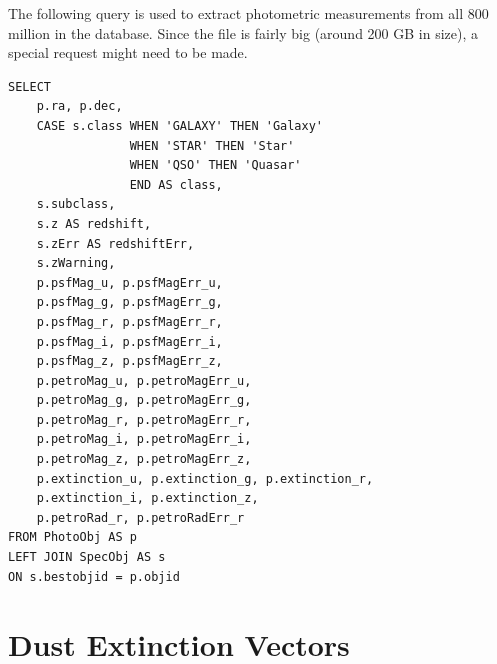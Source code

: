The following query is used to extract photometric measurements from all 800 million
in the database. Since the file is fairly big (around 200 GB in size),
a special request might need to be made.

\begin{verbatim}
SELECT
	p.ra, p.dec,
	CASE s.class WHEN 'GALAXY' THEN 'Galaxy'
				 WHEN 'STAR' THEN 'Star'
				 WHEN 'QSO' THEN 'Quasar'
				 END AS class,
	s.subclass,
	s.z AS redshift,
	s.zErr AS redshiftErr,
	s.zWarning,
	p.psfMag_u, p.psfMagErr_u,
	p.psfMag_g, p.psfMagErr_g,
	p.psfMag_r, p.psfMagErr_r,
	p.psfMag_i, p.psfMagErr_i,
	p.psfMag_z, p.psfMagErr_z,
	p.petroMag_u, p.petroMagErr_u,
	p.petroMag_g, p.petroMagErr_g,
	p.petroMag_r, p.petroMagErr_r,
	p.petroMag_i, p.petroMagErr_i,
	p.petroMag_z, p.petroMagErr_z,
	p.extinction_u, p.extinction_g, p.extinction_r,
	p.extinction_i, p.extinction_z,
	p.petroRad_r, p.petroRadErr_r
FROM PhotoObj AS p
LEFT JOIN SpecObj AS s
ON s.bestobjid = p.objid
\end{verbatim}














\chapter{Dust Extinction Vectors} 
\label{cha:dustvectors}

